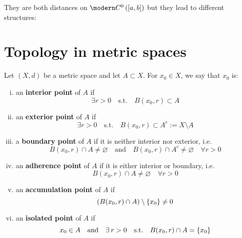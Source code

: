 They are both distances on $\Cc^0\left( [a,b] \right)$ but they lead to different structures:


\newpage

\section{Topology in metric spaces} %
\label{sec:topology_in_metric_spaces}

\begin{defn}
Let $(X,d)$ be a metric space and let $A\subset X$. For $x_0\in X$, we say that $x_0$ is:
\begin{enumerate}[(i)]
    \item an \textbf{interior point} of $A$ if
    \begin{equation*}
    \exists r>0\quad\text{s.t.}\quad B(x_0,r)\subset A
    \end{equation*}

    \item an \textbf{exterior point} of $A$ if
    \begin{equation*}
    \exists r>0\quad\text{s.t.}\quad B(x_0,r)\subset A^c:=X\setminus A
    \end{equation*}

    \item a \textbf{boundary point} of $A$ if it is neither interior nor exterior, i.e.
    \begin{equation*}
    B(x_0,r)\cap A\neq\varnothing\quad\text{and}\quad B(x_0,r)\cap A^c\neq\varnothing\quad\forall r>0
    \end{equation*}

    \item an \textbf{adherence point} of $A$ if it is either interior or boundary, i.e.
    \begin{equation*}
    B(x_0,r)\cap A\neq\varnothing\quad\forall r>0
    \end{equation*}

    \item an \textbf{accumulation point} of $A$ if
    \begin{equation*}
    \left( B(x_0,r)\cap A \right)\setminus \left\{ x_0 \right\}\neq 0
    \end{equation*}

    \item an \textbf{isolated point} of $A$ if
    \begin{equation*}
    x_0\in A\quad\text{and}\quad \exists r>0\quad\text{s.t.}\quad B(x_0,r)\cap A=\gr{x_0}
    \end{equation*}


\end{enumerate}
\end{defn}
